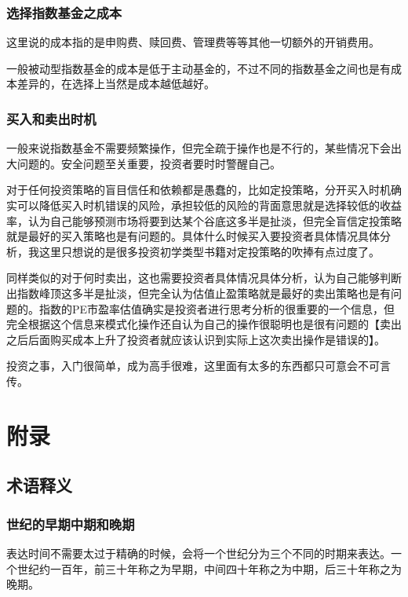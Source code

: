 \documentclass[12pt,oneside]{book}
\begin{document}
\section{选择指数基金之成本}
这里说的成本指的是申购费、赎回费、管理费等等其他一切额外的开销费用。

一般被动型指数基金的成本是低于主动基金的，不过不同的指数基金之间也是有成本差异的，在选择上当然是成本越低越好。




\section{买入和卖出时机}
一般来说指数基金不需要频繁操作，但完全疏于操作也是不行的，某些情况下会出大问题的。安全问题至关重要，投资者要时时警醒自己。

对于任何投资策略的盲目信任和依赖都是愚蠢的，比如定投策略，分开买入时机确实可以降低买入时机错误的风险，承担较低的风险的背面意思就是选择较低的收益率，认为自己能够预测市场将要到达某个谷底这多半是扯淡，但完全盲信定投策略就是最好的买入策略也是有问题的。具体什么时候买入要投资者具体情况具体分析，我这里只想说的是很多投资初学类型书籍对定投策略的吹捧有点过度了。

同样类似的对于何时卖出，这也需要投资者具体情况具体分析，认为自己能够判断出指数峰顶这多半是扯淡，但完全认为估值止盈策略就是最好的卖出策略也是有问题的。指数的PE市盈率估值确实是投资者进行思考分析的很重要的一个信息，但完全根据这个信息来模式化操作还自认为自己的操作很聪明也是很有问题的【卖出之后后面购买成本上升了投资者就应该认识到实际上这次卖出操作是错误的】。

投资之事，入门很简单，成为高手很难，这里面有太多的东西都只可意会不可言传。



\part{附录}




\chapter{术语释义}
\section{世纪的早期中期和晚期}
表达时间不需要太过于精确的时候，会将一个世纪分为三个不同的时期来表达。一个世纪约一百年，前三十年称之为早期，中间四十年称之为中期，后三十年称之为晚期。
\end{document}
